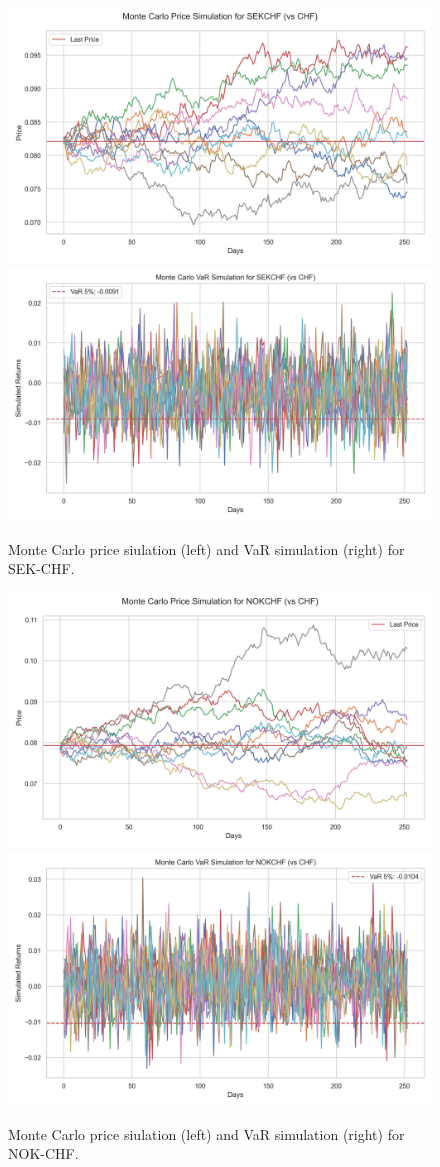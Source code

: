 \documentclass{article}
\begin{document}
\begin{figure}[H]
    \centering  \includegraphics[width=0.48\linewidth]{../../reports/figures/monte_carlo_price_simulation_SEKCHF_vs_CHF.png} \label{fig:monte_carlo_price_simulation_SEKCHF_vs_CHF}
    \includegraphics[width=0.48\linewidth]{../../reports/figures/monte_carlo_var_simulation_SEKCHF_vs_CHF.png} \label{fig:monte_carlo_var_simulation_SEKCHF_vs_CHF}
    \caption{\footnotesize Monte Carlo price siulation (left) and VaR simulation (right) for SEK-CHF.}
\end{figure}

\begin{figure}[H]
    \centering  \includegraphics[width=0.48\linewidth]{../../reports/figures/monte_carlo_price_simulation_NOKCHF_vs_CHF.png} \label{fig:monte_carlo_price_simulation_NOKCHF_vs_CHF}
    \includegraphics[width=0.48\linewidth]{../../reports/figures/monte_carlo_var_simulation_NOKCHF_vs_CHF.png} \label{fig:monte_carlo_var_simulation_NOKCHF_vs_CHF}
    \caption{\footnotesize Monte Carlo price siulation (left) and VaR simulation (right) for NOK-CHF.}
\end{figure}
\end{document}
